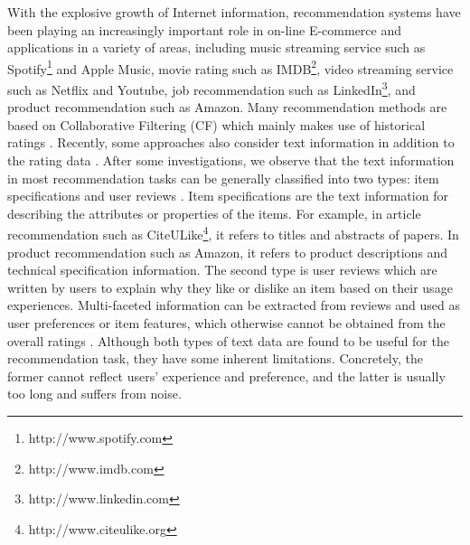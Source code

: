 \documentclass[sigconf]{acmart}
\begin{document}
With the explosive growth of Internet information, recommendation systems have been playing an increasingly important role in on-line E-commerce and applications in a variety of areas, including music streaming service such as  Spotify\footnote{http://www.spotify.com} and Apple Music, movie rating such as IMDB\footnote{http://www.imdb.com}, video streaming service such as Netflix and Youtube, job recommendation such as LinkedIn\footnote{http://www.linkedin.com}, and product recommendation such as Amazon.
Many recommendation methods are based on Collaborative Filtering (CF) which mainly makes use of historical ratings \cite{sarwar2001item,mnih2007probabilistic,koren2009matrix,koren2008factorization,shi2010list,lee2001algorithms,marlin2003modeling}.
Recently, some approaches also consider text information in addition to the rating data \cite{wang2011collaborative,mcauley2013hidden,ling2014ratings,almahairi2015learning,zheng2017joint,rensocial2017}.
After some investigations, we observe that the text information in most recommendation tasks can be generally classified into two types: item specifications \cite{wang2011collaborative,wang2015collaborative,wang2016collaborative} and user reviews \cite{mcauley2013hidden,xu2014collaborative,ling2014ratings,xu2015unified,almahairi2015learning,zheng2017joint,rensocial2017}. Item specifications are the text information for describing the attributes or properties of the items.
For example, in article recommendation such as CiteULike\footnote{http://www.citeulike.org}, it refers to titles and abstracts of papers. In product recommendation such as Amazon, it refers to product descriptions and technical specification information.
The second type is user reviews which are written by users to explain why they like or dislike an item based on their usage experiences.  Multi-faceted information can be extracted from reviews and used as user preferences or item features, which otherwise cannot be obtained from the overall ratings \cite{chen2015recommender}.
Although both types of text data are found to be useful for the recommendation task, they have some inherent limitations.
Concretely, the former cannot reflect users' experience and preference, and the latter is usually too long and suffers from noise.
\end{document}
